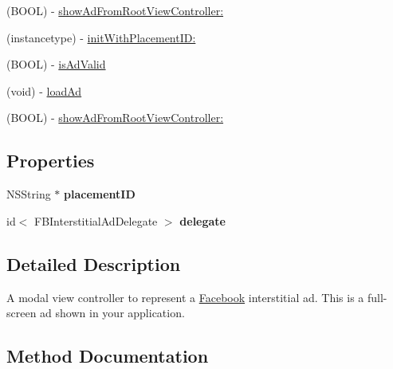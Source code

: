 \begin{DoxyCompactItemize}
\item 
(B\+O\+OL) -\/ \hyperlink{interfaceFBInterstitialAd_ac9c071a5f699e990e1fa65060fe5c1ce}{show\+Ad\+From\+Root\+View\+Controller\+:}
\item 
(instancetype) -\/ \hyperlink{interfaceFBInterstitialAd_afb4f482b5ab19d486c77785c7794111d}{init\+With\+Placement\+I\+D\+:}
\item 
(B\+O\+OL) -\/ \hyperlink{interfaceFBInterstitialAd_aff851ea8a260430a5b09bce633826876}{is\+Ad\+Valid}
\item 
(void) -\/ \hyperlink{interfaceFBInterstitialAd_a4bbd516a1c5f381ab7af76c2e113fd86}{load\+Ad}
\item 
(B\+O\+OL) -\/ \hyperlink{interfaceFBInterstitialAd_ac9c071a5f699e990e1fa65060fe5c1ce}{show\+Ad\+From\+Root\+View\+Controller\+:}
\end{DoxyCompactItemize}
\subsection*{Properties}
\begin{DoxyCompactItemize}
\item 
\mbox{\label{interfaceFBInterstitialAd_a2937e4190eea6481f79f548c2477a915}} 
N\+S\+String $\ast$ {\bfseries placement\+ID}
\item 
\mbox{\label{interfaceFBInterstitialAd_a010a3b04aeb7704943da0ccb02ac1704}} 
id$<$ F\+B\+Interstitial\+Ad\+Delegate $>$ {\bfseries delegate}
\end{DoxyCompactItemize}


\subsection{Detailed Description}
A modal view controller to represent a \hyperlink{interfaceFacebook}{Facebook} interstitial ad. This is a full-\/screen ad shown in your application. 

\subsection{Method Documentation}
\mbox{\label{interfaceFBInterstitialAd_afb4f482b5ab19d486c77785c7794111d}} 
